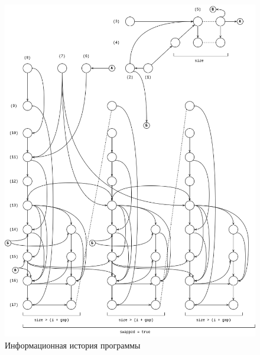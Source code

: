 \documentclass[14pt,a4paper]{scrreprt}
\begin{document}
\begin{center}
	\begin{figure}[H]
		\captionsetup{singlelinecheck = false, justification=centering}
		\centering
		\includegraphics[width=\linewidth]{assets/comb-ihist.drawio.png}
		\caption{Информационная история программы}
	\end{figure}
\end{center}
\end{document}

